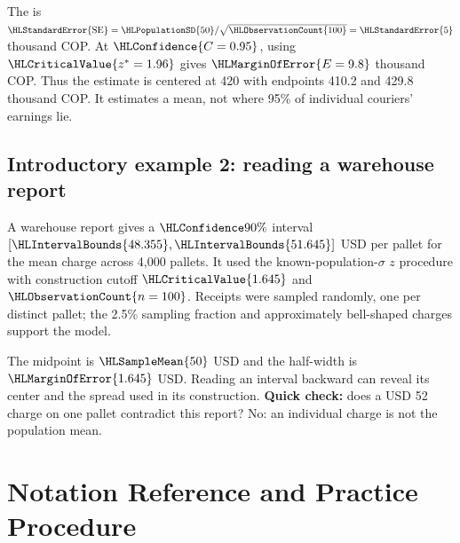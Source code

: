 The  is $\HLStandardError{\mathrm{SE}}=\HLPopulationSD{50}/\sqrt{\HLObservationCount{100}}=\HLStandardError{5}$ thousand COP. At $\HLConfidence{C=0.95}$, using $\HLCriticalValue{z^*=1.96}$ gives $\HLMarginOfError{E=9.8}$ thousand COP. Thus the estimate is centered at 420 with endpoints 410.2 and 429.8 thousand COP. It estimates a mean, not where 95\% of individual couriers' earnings lie.

\subsection{Introductory example 2: reading a warehouse report}\label{ex:intro-two}
A warehouse report gives a $\HLConfidence{90\%}$ interval $[\HLIntervalBounds{48.355},\HLIntervalBounds{51.645}]$ USD per pallet for the mean charge across 4,000 pallets. It used the known-population-$\sigma$ $z$ procedure with construction cutoff $\HLCriticalValue{1.645}$ and $\HLObservationCount{n=100}$. Receipts were sampled randomly, one per distinct pallet; the 2.5\% sampling fraction and approximately bell-shaped charges support the model.

The midpoint is $\HLSampleMean{50}$ USD and the half-width is $\HLMarginOfError{1.645}$ USD. Reading an interval backward can reveal its center and the spread used in its construction. \textbf{Quick check:} does a USD 52 charge on one pallet contradict this report? No: an individual charge is not the population mean.

\clearpage
\section{Notation Reference and Practice Procedure}\label{sec:notation-and-procedure}
